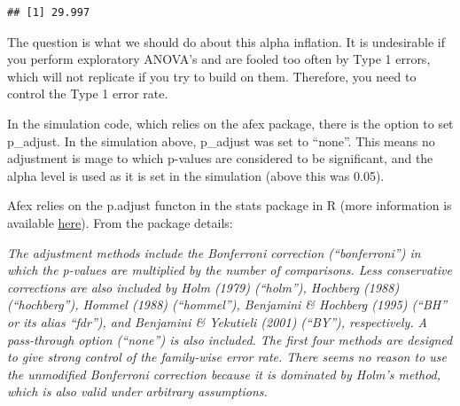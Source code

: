 \documentclass[]{article}
\newenvironment{Shaded}{\begin{snugshade}}{\end{snugshade}}
\newcommand{\KeywordTok}[1]{\textcolor[rgb]{0.13,0.29,0.53}{\textbf{#1}}}
\newcommand{\DecValTok}[1]{\textcolor[rgb]{0.00,0.00,0.81}{#1}}
\newcommand{\StringTok}[1]{\textcolor[rgb]{0.31,0.60,0.02}{#1}}
\newcommand{\ControlFlowTok}[1]{\textcolor[rgb]{0.13,0.29,0.53}{\textbf{#1}}}
\newcommand{\OperatorTok}[1]{\textcolor[rgb]{0.81,0.36,0.00}{\textbf{#1}}}
\newcommand{\NormalTok}[1]{#1}
\begin{document}
\begin{Shaded}
\end{Shaded}

\begin{verbatim}
## [1] 29.997
\end{verbatim}

The question is what we should do about this alpha inflation. It is
undesirable if you perform exploratory ANOVA's and are fooled too often
by Type 1 errors, which will not replicate if you try to build on them.
Therefore, you need to control the Type 1 error rate.

In the simulation code, which relies on the afex package, there is the
option to set p\_adjust. In the simulation above, p\_adjust was set to
``none''. This means no adjustment is mage to which p-values are
considered to be significant, and the alpha level is used as it is set
in the simulation (above this was 0.05).

Afex relies on the p.adjust functon in the stats package in R (more
information is available
\href{https://www.rdocumentation.org/packages/stats/versions/3.1.1/topics/p.adjust}{here}).
From the package details:

\emph{The adjustment methods include the Bonferroni correction
(``bonferroni'') in which the p-values are multiplied by the number of
comparisons. Less conservative corrections are also included by Holm
(1979) (``holm''), Hochberg (1988) (``hochberg''), Hommel (1988)
(``hommel''), Benjamini \& Hochberg (1995) (``BH'' or its alias
``fdr''), and Benjamini \& Yekutieli (2001) (``BY''), respectively. A
pass-through option (``none'') is also included. The first four methods
are designed to give strong control of the family-wise error rate. There
seems no reason to use the unmodified Bonferroni correction because it
is dominated by Holm's method, which is also valid under arbitrary
assumptions.}
\end{document}
